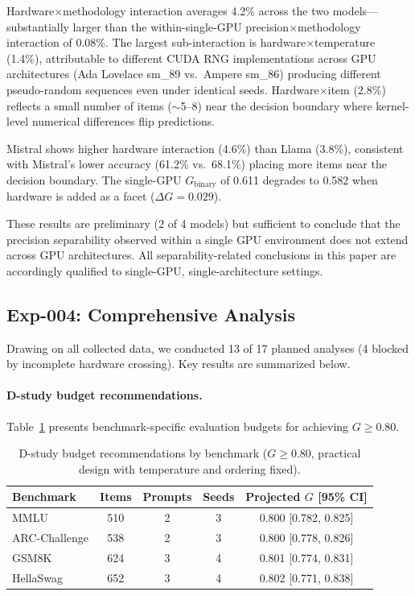 \documentclass[letterpaper]{article}
\begin{document}
Hardware$\times$methodology interaction averages 4.2\% across the two models---substantially larger than the within-single-GPU precision$\times$methodology interaction of 0.08\%.
The largest sub-interaction is hardware$\times$temperature (1.4\%), attributable to different CUDA RNG implementations across GPU architectures (Ada Lovelace sm\_89 vs.\ Ampere sm\_86) producing different pseudo-random sequences even under identical seeds.
Hardware$\times$item (2.8\%) reflects a small number of items ($\sim$5--8) near the decision boundary where kernel-level numerical differences flip predictions.

Mistral shows higher hardware interaction (4.6\%) than Llama (3.8\%), consistent with Mistral's lower accuracy (61.2\% vs.\ 68.1\%) placing more items near the decision boundary.
The single-GPU $G_{\text{binary}}$ of 0.611 degrades to 0.582 when hardware is added as a facet ($\Delta G = 0.029$).

These results are preliminary (2 of 4 models) but sufficient to conclude that the precision separability observed within a single GPU environment does not extend across GPU architectures.
All separability-related conclusions in this paper are accordingly qualified to single-GPU, single-architecture settings.

\subsection{Exp-004: Comprehensive Analysis}
\label{sec:exp004}

Drawing on all collected data, we conducted 13 of 17 planned analyses (4 blocked by incomplete hardware crossing).
Key results are summarized below.

\paragraph{D-study budget recommendations.}
Table~\ref{tab:d_study_budgets} presents benchmark-specific evaluation budgets for achieving $G \geq 0.80$.

\begin{table}[t]
\centering
\caption{D-study budget recommendations by benchmark ($G \geq 0.80$, practical design with temperature and ordering fixed).}
\label{tab:d_study_budgets}
\begin{tabular}{lcccc}
\toprule
Benchmark & Items & Prompts & Seeds & Projected $G$ [95\% CI] \\
\midrule
MMLU          & 510 & 2 & 3 & 0.800 [0.782, 0.825] \\
ARC-Challenge & 538 & 2 & 3 & 0.800 [0.778, 0.826] \\
GSM8K         & 624 & 3 & 4 & 0.801 [0.774, 0.831] \\
HellaSwag     & 652 & 3 & 4 & 0.802 [0.771, 0.838] \\
\bottomrule
\end{tabular}
\end{table}
\end{document}

